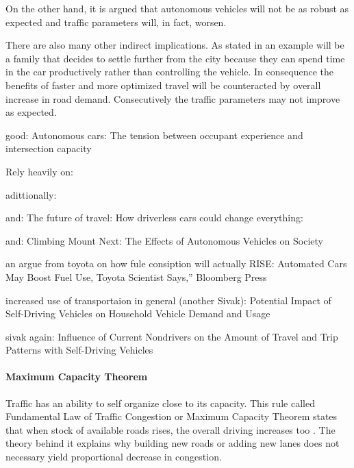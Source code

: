 \documentclass[11pt,english]{article}
\begin{document}
On the other hand, it is argued that autonomous vehicles will not be as robust as expected and traffic parameters will, in fact, worsen\citep{sivak2015road}.

There are also many other indirect implications. As stated in \citep{litman2014autonomous} an example will be a family that decides to settle further from the city because they can spend time in the car productively rather than controlling the vehicle. In consequence the benefits of faster and more optimized travel will be counteracted by overall increase in road demand. Consecutively the traffic parameters may not improve as expected.

good:
Autonomous cars: The tension between occupant experience and intersection capacity


Rely heavily on:
\citep{litman2014autonomous}

adittionally:


and:
The future of travel: How driverless cars could change everything:


and:
Climbing Mount Next: The Effects of Autonomous Vehicles on Society


an argue from toyota on how fule consiption will actually RISE:
Automated Cars May Boost Fuel Use, Toyota Scientist Says,” Bloomberg Press



increased use of transportaion in general (another Sivak):
Potential Impact of Self-Driving Vehicles on Household
Vehicle Demand and Usage



sivak again:
Influence of Current Nondrivers on the Amount of Travel and
Trip Patterns with Self-Driving Vehicles




\paragraph{Maximum Capacity Theorem}
Traffic has an ability to self organize close to its capacity. This rule called Fundamental Law of Traffic Congestion or Maximum Capacity Theorem states that when stock of available roads rises, the overall driving increases too \citep{duranton2011fundamental}. The theory behind it explains why building new roads or adding new lanes does not necessary yield proportional decrease in congestion.
\end{document}
